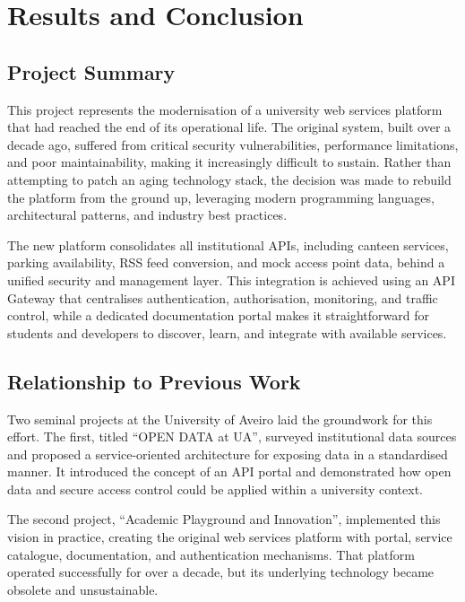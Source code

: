 \documentclass[12pt, a4paper]{report}
\begin{document}
\chapter{Results and Conclusion}
\label{chap:results}

\section{Project Summary}
This project represents the modernisation of a university web services platform that had
reached the end of its operational life. The original system, built over a decade ago,
suffered from critical security vulnerabilities, performance limitations, and poor
maintainability, making it increasingly difficult to sustain. Rather than attempting to
patch an aging technology stack, the decision was made to rebuild the platform from the
ground up, leveraging modern programming languages, architectural patterns, and industry
best practices.

The new platform consolidates all institutional APIs, including canteen services,
parking availability, RSS feed conversion, and mock access point data, behind a unified
security and management layer. This integration is achieved using an API Gateway that
centralises authentication, authorisation, monitoring, and traffic control, while a
dedicated documentation portal makes it straightforward for students and developers to
discover, learn, and integrate with available services.

\section{Relationship to Previous Work}
Two seminal projects at the University of Aveiro laid the groundwork for this effort.
The first, titled ``OPEN DATA at UA'', surveyed institutional data sources and proposed
a service-oriented architecture for exposing data in a standardised manner. It introduced
the concept of an API portal and demonstrated how open data and secure access control
could be applied within a university context.

The second project, ``Academic Playground and Innovation'', implemented this vision in
practice, creating the original web services platform with portal, service catalogue,
documentation, and authentication mechanisms. That platform operated successfully for
over a decade, but its underlying technology became obsolete and unsustainable.
\end{document}
